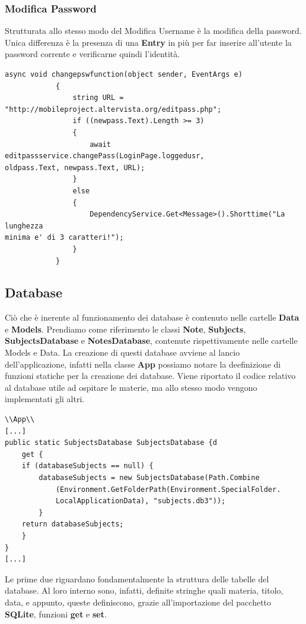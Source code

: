 \documentclass[a4paper, 50pt, twoside]{article}
\begin{document}
\subsubsection{Modifica Password}
Strutturata allo stesso modo del Modifica Username è la modifica della password. Unica differenza è la presenza di una \textbf{Entry} in più per far inserire all'utente la password corrente e verificarne quindi l'identità. 
\begin{lstlisting}
async void changepswfunction(object sender, EventArgs e)
            {
                string URL = 
"http://mobileproject.altervista.org/editpass.php";
                if ((newpass.Text).Length >= 3)
                {
                    await editpassservice.changePass(LoginPage.loggedusr, 
oldpass.Text, newpass.Text, URL);
                }
                else
                {
                    DependencyService.Get<Message>().Shorttime("La lunghezza 
minima e' di 3 caratteri!");
                }
            }
\end{lstlisting}
\subsection{Database}
Ciò che è inerente al funzionamento dei database è contenuto nelle cartelle \textbf{Data} e \textbf{Models}. Prendiamo come riferimento le classi \textbf{Note}, \textbf{Subjects}, \textbf{SubjectsDatabase} e \textbf{NotesDatabase}, contenute rispettivamente nelle cartelle Models e Data.
La creazione di questi database avviene al lancio dell'applicazione, infatti nella classe \textbf{App} possiamo notare la deefinizione di funzioni statiche per la creazione dei database. Viene riportato il codice relativo al database utile ad ospitare le materie, ma allo stesso modo vengono implementati gli altri.

\begin{lstlisting}
\\App\\
[...]
public static SubjectsDatabase SubjectsDatabase {d
	get {
	if (databaseSubjects == null) {
		databaseSubjects = new SubjectsDatabase(Path.Combine
			(Environment.GetFolderPath(Environment.SpecialFolder.
			LocalApplicationData), "subjects.db3"));
		}
	return databaseSubjects;
	}
}
[...]
\end{lstlisting}

Le prime due riguardano fondamentalmente la struttura delle tabelle del database. Al loro interno sono, infatti, definite stringhe quali materia, titolo, data, e appunto, queste definiscono, grazie all'importazione del pacchetto \textbf{SQLite}, funzioni \textbf{get} e \textbf{set}.
\end{document}
